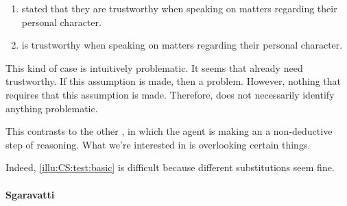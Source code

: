 \begin{note}[Testimony 1]
  \begin{illustration}[Testimony 1]
    \label{illu:CS:test:basic}
    \mbox{}
    \begin{enumerate}[label=\arabic*., ref=(\arabic*)]
    \item
      \label{ex:eiS:t:basic:test}
       stated that they are trustworthy when speaking on matters regarding their personal character.
    \item
      \label{ex:eiS:t:basic:ok}
       is trustworthy when speaking on matters regarding their personal character.
    \end{enumerate}
  \end{illustration}
  This kind of case is intuitively problematic.
  It seems that already need trustworthy.
  If this assumption is made, then a problem.
  However, nothing that requires that this assumption is made.
  Therefore, \ideaCS{} does not necessarily identify anything problematic.

  This contrasts to the other , in which the agent is making an a non-deductive step of reasoning.
  What we're interested in is overlooking certain things.

  Indeed, \autoref{illu:CS:test:basic} is difficult because different substitutions seem fine.
\end{note}

\paragraph{Sgaravatti}

